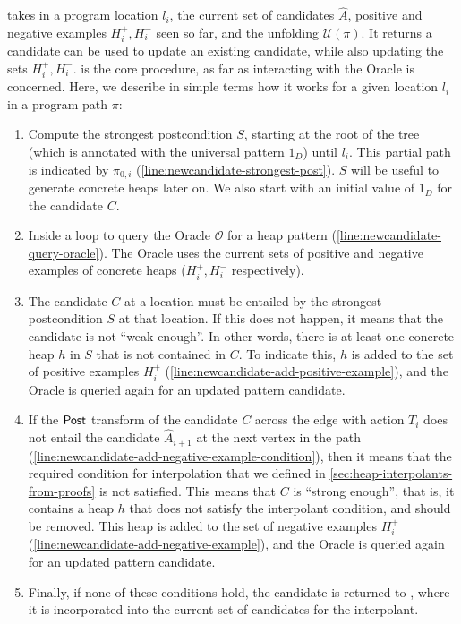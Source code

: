 \newcandidate takes in a program location $l_i$, the current set of candidates $\hat{A}$, positive and negative examples $H_i^{+}, H_i^{-}$ seen so far, and the unfolding $\mathcal{U}(\pi)$. It returns a candidate can be used to update an existing candidate, while also updating the sets $H_i^{+}, H_i^{-}$. \newcandidate is the core procedure, as far as interacting with the Oracle is concerned. Here, we describe in simple terms how it works for a given location $l_i$ in a program path $\pi$:

\begin{enumerate}
  \item Compute the strongest postcondition $S$, starting at the root of the tree (which is annotated with the universal pattern $1_D$) until $l_i$. This partial path is indicated by $\pi_{0,i}$ (\autoref{line:newcandidate-strongest-post}). $S$ will be useful to generate concrete heaps later on. We also start with an initial value of $1_D$ for the candidate $C$.
  \item Inside a loop to query the Oracle $\mathcal{O}$ for a heap pattern (\autoref{line:newcandidate-query-oracle}). The Oracle uses the current sets of positive and negative examples of concrete heaps ($H_i^{+}, H_i^{-}$ respectively).
  \item The candidate $C$ at a location must be entailed by the strongest postcondition $S$ at that location. If this does not happen, it means that the candidate is not ``weak enough''. In other words, there is at least one concrete heap $h$ in $S$ that is not contained in $C$. To indicate this, $h$ is added to the set of positive examples $H_i^{+}$ (\autoref{line:newcandidate-add-positive-example}), and the Oracle is queried again for an updated pattern candidate.
  \item If the $\mathsf{Post}$ transform of the candidate $C$ across the edge with action $T_i$ does not entail the candidate $\hat{A}_{i+1}$ at the next vertex in the path (\autoref{line:newcandidate-add-negative-example-condition}), then it means that the required condition for interpolation that we defined in \autoref{sec:heap-interpolants-from-proofs} is not satisfied. This means that $C$ is ``strong enough'', that is, it contains a heap $h$ that does not satisfy the interpolant condition, and should be removed. This heap is added to the set of negative examples $H_i^{+}$ (\autoref{line:newcandidate-add-negative-example}), and the Oracle is queried again for an updated pattern candidate.
  \item Finally, if none of these conditions hold, the candidate is returned to \seplearner, where it is incorporated into the current set of candidates for the interpolant.
\end{enumerate}

